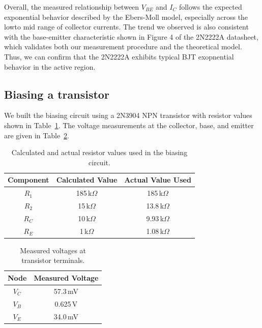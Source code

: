 \documentclass{article}
\begin{document}
\noindent Overall, the measured relationship between $V_{BE}$ and $I_C$ follows the expected
exponential behavior described by the Ebers-Moll model, especially across the lowto 
mid range of collector currents. The trend we observed is also consistent with
the base-emitter characteristic shown in Figure 4 of the 2N2222A datasheet,
which validates both our measurement procedure and the theoretical model.
Thus, we can confirm that the 2N2222A exhibits typical BJT exopnential behavior
in the active region.

\subsection{Biasing a transistor}

We built the biasing circuit using a 2N3904 NPN transistor with 
resistor values shown in Table~\ref{tab:biasing_resistors}. The voltage 
measurements at the collector, base, and emitter are given in 
Table~\ref{tab:biasing_voltages}.

\begin{table}[H]
    \centering
    \begin{tabular}{|c|c|c|}
        \hline
        Component & Calculated Value & Actual Value Used \\
        \hline
        $R_1$ & 185\,k$\Omega$ & 185\,k$\Omega$ \\
        $R_2$ & 15\,k$\Omega$ & 13.8\,k$\Omega$ \\
        $R_C$ & 10\,k$\Omega$ & 9.93\,k$\Omega$ \\
        $R_E$ & 1\,k$\Omega$ & 1.08\,k$\Omega$ \\
        \hline
    \end{tabular}
    \caption{Calculated and actual resistor values used in the biasing circuit.}
    \label{tab:biasing_resistors}
\end{table}

\begin{table}[H]
    \centering
    \begin{tabular}{|c|c|}
        \hline
        Node & Measured Voltage \\
        \hline
        $V_C$ & 57.3\,mV \\
        $V_B$ & 0.625\,V \\
        $V_E$ & 34.0\,mV \\
        \hline
    \end{tabular}
    \caption{Measured voltages at transistor terminals.}
    \label{tab:biasing_voltages}
\end{table}
\end{document}
